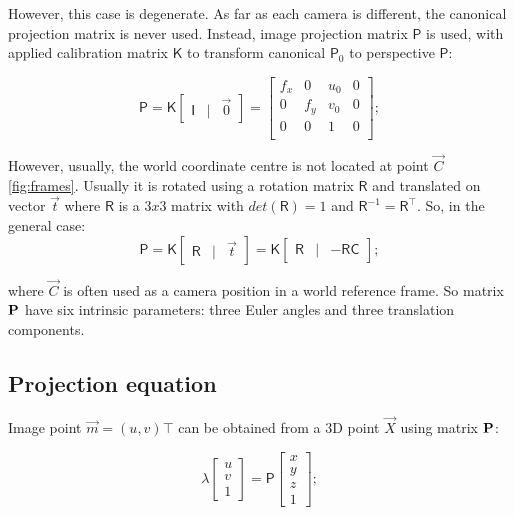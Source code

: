 However, this case is degenerate. 
As far as each camera is different, the canonical projection matrix is never used. Instead, image projection matrix $\pmb{\mathsf{P}}$ is used, with applied calibration matrix $\pmb{\mathsf{K}}$ to transform canonical $\pmb{\mathsf{P}}_0$ to perspective $\pmb{\mathsf{P}}$:

\begin{equation}
\pmb{\mathsf{P}} = \pmb{\mathsf{K}} \begin{bmatrix} \pmb{\mathsf{I}} & | & \vec{0} \end{bmatrix} = 
    \begin{bmatrix} 
    f_x & 0 & u_0 & 0 \\
    0 & f_y & v_0 & 0 \\ 
    0 & 0 & 1 & 0 \\
    \end{bmatrix}; 
\end{equation}

However, usually, the world coordinate centre is not located at point $\vec{C}$ \autoref{fig:frames}. 
Usually it is rotated using a rotation matrix $\pmb{\mathsf{R}}$ and translated on vector $\vec{t}$ where $\pmb{\mathsf{R}}$ is a $3x3$ matrix with $det(\pmb{\mathsf{R}}) = 1$ and $\pmb{\mathsf{R}}^{-1} = \pmb{\mathsf{R}}^\top$. 
So, in the general case:
\begin{equation}
    \pmb{\mathsf{P}} = \pmb{\mathsf{K}} \begin{bmatrix} \pmb{\mathsf{R}} & | & \vec{t} \end{bmatrix} = 
    \pmb{\mathsf{K}} \begin{bmatrix} \pmb{\mathsf{R}} & | & - \pmb{\mathsf{R}} \pmb{\mathsf{C}} \end{bmatrix};
\end{equation}

where $\vec{C}$ is often used as a camera position in a world reference frame. 
So matrix $\bf{P}$ have six intrinsic parameters: three Euler angles and three translation components. 

\subsection{Projection equation}

Image point $\vec{m} = (u, v)\top$ can be obtained from a 3D point $\vec{X}$ using matrix $\bf{P}$:

\begin{equation}
    \label{eq:projection}
    \lambda \begin{bmatrix} 
        u \\ v \\ 1 \end{bmatrix} = \pmb{\mathsf{P}} \begin{bmatrix} x \\ y \\ z \\ 1
    \end{bmatrix};
\end{equation}

